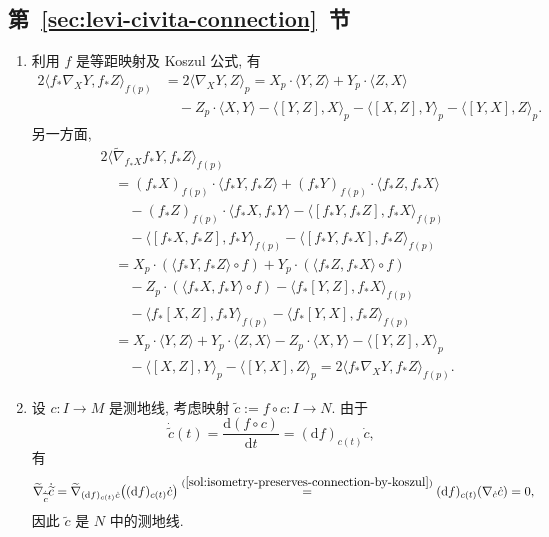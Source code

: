 \subsection{\texorpdfstring{第~\ref{sec:levi-civita-connection}~节}{Levi-Civita 联络}}\label{subsec:solutions-levi-civita-connection}

\begin{description}[font=\normalfont,leftmargin=2em,labelwidth=1.5em]
\begin{enumerate}[label=(\alph*),ref=\alph*,leftmargin=*]
\item\label{sol:isometry-preserves-connection-by-koszul} 利用 $f$ 是等距映射及 Koszul 公式, 有
\begin{align*}
  2\langle f_*\nabla_XY,f_*Z\rangle_{f(p)}
  &=2\langle\nabla_XY,Z\rangle_p=X_p\cdot\langle Y,Z\rangle+Y_p\cdot\langle Z,X\rangle\\
  &\quad-Z_p\cdot\langle X,Y\rangle-\langle[Y,Z],X\rangle_p
        -\langle[X,Z],Y\rangle_p-\langle[Y,X],Z\rangle_p.
\end{align*}
另一方面,
\begin{align*}
  &2\langle\widetilde\nabla_{f_*X}f_*Y,f_*Z\rangle_{f(p)}\\
  &\quad=(f_*X)_{f(p)}\cdot\langle f_*Y,f_*Z\rangle
        +(f_*Y)_{f(p)}\cdot\langle f_*Z,f_*X\rangle\\
  &\qquad-(f_*Z)_{f(p)}\cdot\langle f_*X,f_*Y\rangle-\langle[f_*Y,f_*Z],f_*X\rangle_{f(p)}\\
  &\qquad-\langle[f_*X,f_*Z],f_*Y\rangle_{f(p)}-\langle[f_*Y,f_*X],f_*Z\rangle_{f(p)}\\
  &\quad=X_p\cdot(\langle f_*Y,f_*Z\rangle\circ f)+Y_p\cdot(\langle f_*Z,f_*X\rangle\circ f)\\
  &\qquad-Z_p\cdot(\langle f_*X,f_*Y\rangle\circ f)-\langle f_*[Y,Z],f_*X\rangle_{f(p)}\\
  &\qquad-\langle f_*[X,Z],f_*Y\rangle_{f(p)}-\langle f_*[Y,X],f_*Z\rangle_{f(p)}\\
  &\quad=X_p\cdot\langle Y,Z\rangle+Y_p\cdot\langle Z,X\rangle
    -Z_p\cdot\langle X,Y\rangle-\langle[Y,Z],X\rangle_p\\
  &\qquad-\langle[X,Z],Y\rangle_p-\langle[Y,X],Z\rangle_p
    =2\langle f_*\nabla_XY,f_*Z\rangle_{f(p)}.
\end{align*}
\item 设 $c:I\to M$ 是测地线, 考虑映射 $\widetilde c:=f\circ c:I\to N$. 由于
\[
  \dot{\widetilde c}(t)=\frac{\mathrm{d}(f\circ c)}{\mathrm{d}t}
   =(\mathrm{d}f)_{c(t)}\dot c,
\]
有
\[
  \widetilde\nabla_{\dot{\widetilde c}}\dot{\widetilde c}
   =\widetilde\nabla_{(\mathrm{d}f)_{c(t)}\dot c}\bigl((\mathrm{d}f)_{c(t)}\dot c\bigr)
   \overset{(\ref{sol:isometry-preserves-connection-by-koszul})}{=}
     (\mathrm{d}f)_{c(t)}(\nabla_{\dot c}\dot c)=0,
\]
因此 $\widetilde c$ 是 $N$ 中的测地线.
\end{enumerate}


\end{description}
